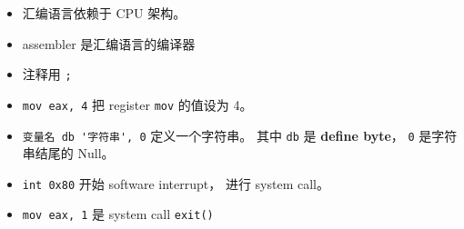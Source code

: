
\begin{issues}
\issueDraft
\end{issues}

\begin{itemize}
\item 汇编语言依赖于 CPU 架构。
\item assembler 是汇编语言的编译器
\item 注释用 \verb|;|
\item \verb|mov eax, 4| 把 register \verb|mov| 的值设为 4。
\item \verb|变量名 db '字符串', 0| 定义一个字符串。 其中 \verb|db| 是 \textbf{define byte}， \verb|0| 是字符串结尾的 Null。
\item \verb|int 0x80| 开始 software interrupt， 进行 system call。
\item \verb|mov eax, 1| 是 system call \verb|exit()|
\end{itemize}
